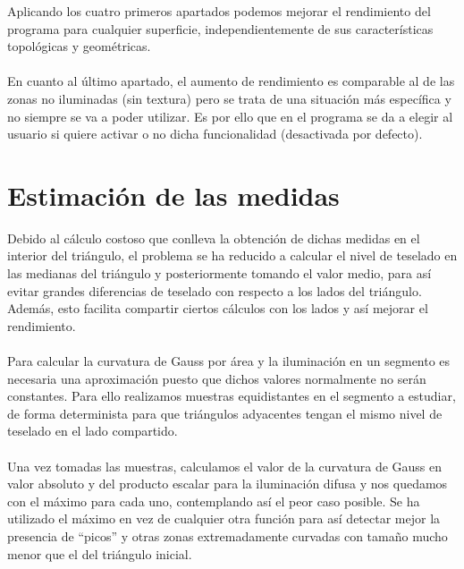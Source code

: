 	Aplicando los cuatro primeros apartados podemos mejorar el rendimiento del programa para cualquier superficie, independientemente de sus características topológicas y geométricas.\\
	\\En cuanto al último apartado, el aumento de rendimiento es comparable al de las zonas no iluminadas (sin textura) pero se trata de una situación más específica y no siempre se va a poder utilizar. Es por ello que en el programa se da a elegir al usuario si quiere activar o no dicha funcionalidad (desactivada por defecto).
	
	
\section{Estimación de las medidas}
	Debido al cálculo costoso que conlleva la obtención de dichas medidas en el interior del triángulo, el problema se ha reducido a calcular el nivel de teselado en las medianas del triángulo y posteriormente tomando el valor medio, para así evitar grandes diferencias de teselado con respecto a los lados del triángulo. Además, esto facilita compartir ciertos cálculos con los lados y así mejorar el rendimiento.\\
	\\Para calcular la curvatura de Gauss por área y la iluminación en un segmento es necesaria una aproximación puesto que dichos valores normalmente no serán constantes. Para ello realizamos muestras equidistantes en el segmento a estudiar, de forma determinista para que triángulos adyacentes tengan el mismo nivel de teselado en el lado compartido.\\
	\\Una vez tomadas las muestras, calculamos el valor de la curvatura de Gauss en valor absoluto y del producto escalar para la iluminación difusa y nos quedamos con el máximo para cada uno, contemplando así el peor caso posible. Se ha utilizado el máximo en vez de cualquier otra función para así detectar mejor la presencia de ``picos'' y otras zonas extremadamente curvadas con tamaño mucho menor que el del triángulo inicial.

\endinput
